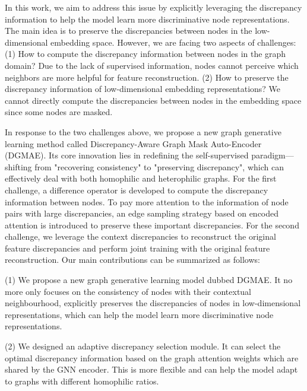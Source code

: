 \documentclass[sigconf]{acmart}
\begin{document}

In this work, we aim to address this issue by explicitly leveraging the discrepancy information to help the model learn more discriminative node representations. The main idea is to preserve the discrepancies between nodes in the low-dimensional embedding space. However, we are facing two aspects of challenges: (1) How to compute the discrepancy information between nodes in the graph domain? Due to the lack of supervised information, nodes cannot perceive which neighbors are more helpful for feature reconstruction. (2) How to preserve the discrepancy information of low-dimensional embedding representations? We cannot directly compute the discrepancies between nodes in the embedding space since some nodes are masked.

In response to the two challenges above, we propose a new graph generative learning method called Discrepancy-Aware Graph Mask Auto-Encoder (DGMAE). Its core innovation lies in redefining the self-supervised paradigm—shifting from "recovering consistency" to "preserving discrepancy", which can effectively deal with both homophilic and heterophilic graphs. For the first challenge, a difference operator is developed to compute the discrepancy information between nodes. To pay more attention to the information of node pairs with large discrepancies, an edge sampling strategy based on encoded attention is introduced to preserve these important discrepancies. For the second challenge, we leverage the context discrepancies to reconstruct the original feature discrepancies and perform joint training with the original feature reconstruction. Our main contributions can be summarized as follows:

(1) We propose a new graph generative learning model dubbed DGMAE. It no more only focuses on the consistency of nodes with their contextual neighbourhood, explicitly preserves the discrepancies of nodes in low-dimensional representations, which can help the model learn more discriminative node representations.

(2) We designed an adaptive discrepancy selection module. It can select the optimal discrepancy information based on the graph attention weights which are shared by the GNN encoder. This is more flexible and can help the model adapt to graphs with different homophilic ratios.
\end{document}
